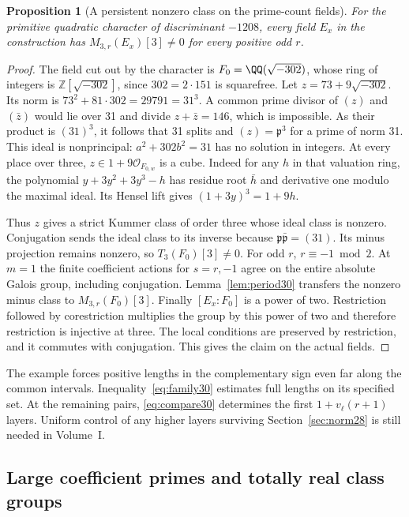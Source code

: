 \documentclass[a4paper,11pt]{article}
\newtheorem{proposition}{Proposition}[section]
\theoremstyle{definition}
\theoremstyle{remark}
\newcommand{\ZZ}{\mathbb Z}\newcommand{\ord}{\operatorname{ord}}
\numberwithin{equation}{section}
\newcommand{\OO}{\mathcal O}
\begin{document}
\begin{proposition}[A persistent nonzero class on the prime-count fields]\label{prop:example30}
For the primitive quadratic character of discriminant \(-1208\), every field \(E_x\) in the construction has \(M_{3,r}(E_x)[3]\ne0\) for every positive odd \(r\).
\end{proposition}
\begin{proof}
The field cut out by the character is \(F_0=\QQ(\sqrt{-302})\), whose ring of integers is \(\ZZ[\sqrt{-302}]\), since \(302=2\cdot151\) is squarefree. Let \(z=73+9\sqrt{-302}\). Its norm is \(73^2+81\cdot302=29791=31^3\). A common prime divisor of \((z)\) and \((\bar z)\) would lie over 31 and divide \(z+\bar z=146\), which is impossible. As their product is \((31)^3\), it follows that 31 splits and \((z)=\mathfrak p^3\) for a prime of norm 31. This ideal is nonprincipal: \(a^2+302b^2=31\) has no solution in integers. At every place over three, \(z\in1+9\OO_{F_{0,w}}\) is a cube. Indeed for any \(h\) in that valuation ring, the polynomial \(y+3y^2+3y^3-h\) has residue root \(\bar h\) and derivative one modulo the maximal ideal. Its Hensel lift gives \((1+3y)^3=1+9h\).

Thus \(z\) gives a strict Kummer class of order three whose ideal class is nonzero. Conjugation sends the ideal class to its inverse because \(\mathfrak p\bar{\mathfrak p}=(31)\). Its minus projection remains nonzero, so \(T_3(F_0)[3]\ne0\). For odd \(r\), \(r\equiv-1\bmod2\). At \(m=1\) the finite coefficient actions for \(s=r,-1\) agree on the entire absolute Galois group, including conjugation. Lemma~\ref{lem:period30} transfers the nonzero minus class to \(M_{3,r}(F_0)[3]\). Finally \([E_x:F_0]\) is a power of two. Restriction followed by corestriction multiplies the group by this power of two and therefore restriction is injective at three. The local conditions are preserved by restriction, and it commutes with conjugation. This gives the claim on the actual fields.
\end{proof}

The example forces positive lengths in the complementary sign even far along the common intervals. Inequality~\eqref{eq:family30} estimates full lengths on its specified set. At the remaining pairs, \eqref{eq:compare30} determines the first \(1+v_\ell(r+1)\) layers. Uniform control of any higher layers surviving Section~\ref{sec:norm28} is still needed in Volume~I.

\subsection{Large coefficient primes and totally real class groups}\label{nav:III-11}
\label{sec:real79}
\end{document}
